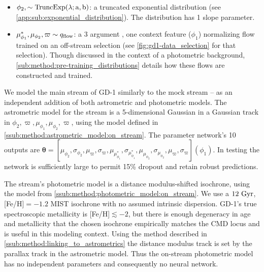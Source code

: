 \documentclass[twocolumn, linenumbers]{aastex631}
\newcommand{\stream}[1]{#1}
\newcommand{\mbs}[1]{\boldsymbol{#1}}
\newcommand{\parallax}{\varpi}
\begin{document}
        \begin{itemize}
            \setlength\itemsep{0em}
            \item $\phi_2, \sim \rm{TruncExp}(\lambda; a, b)$: a truncated
                exponential distribution (see
                \autoref{app:sub:exponential_distribution}).  The distribution
                has 1 slope parameter.
            \item $\mu_{\phi_1}^*, \mu_{\phi_2}, \varpi \sim q_{\rm flow}$: a 3
                argument , one context feature ($\phi_1$) normalizing flow
                trained on an off-stream selection (see
                \autoref{fig:gd1-data_selection} for that
                selection). Though discussed in the context of a photometric
                background, \autoref{sub:method:pre-training_distributions}
                details how these flows are constructed and trained.
        \end{itemize}

        We model the main stream of \stream{GD-1} similarly to the mock stream
        -- as an independent addition of both astrometric and photometric
        models.  The astrometric model for the stream is a 5-dimensional
        Gaussian in a Gaussian track in $\phi_2, \parallax, \mu_{\phi_1},
        \mu_{\phi_2}, \parallax$, using the model defined in
        \autoref{ssub:method:astrometric_model:on_stream}.  The parameter
        network's 10 outputs are $\mbs{\theta} = [\mu_{\phi_2}, \sigma_{\phi_2},
        \mu_\parallax, \sigma_\parallax, \mu_{\mu_{\phi_1}^*},
        \sigma_{\mu_{\phi_1}^*}, \mu_{\mu_{\phi_2}}, \sigma_{\mu_{\phi_2}},
        \mu_\parallax, \sigma_\parallax](\phi_1)$.  In testing the network is
        sufficiently large to permit 15\% dropout and retain robust predictions.

        The stream's photometric model is a distance modulus-shifted isochrone,
        using the model from \autoref{ssub:method:photometric_model:on_stream}.
        We use a $12 \ \rm{Gyr}$, [Fe/H]$ = -1.2$ MIST isochrone with no assumed
        intrinsic dispersion.  \stream{GD-1}'s true spectroscopic metallicity is
        [Fe/H]$\lesssim-2$, but there is enough degeneracy in age and
        metallicity that the chosen isochrone empirically matches the CMD locus
        and is useful in this modeling context.  Using the method described in
        \autoref{ssub:method:linking_to_astrometrics} the distance modulus track
        is set by the parallax track in the astrometric model. Thus the
        on-stream photometric model has no independent parameters and
        consequently no neural network.
\end{document}
